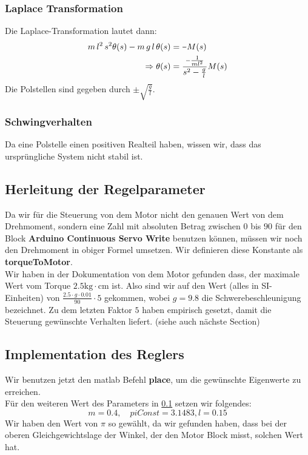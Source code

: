 \documentclass{article}
\newcommand{\minus}{\scalebox{0.75}[1.0]{$-$}}
\newcommand{\geru}{\"{u}}
\begin{document}
\subsubsection{Laplace Transformation}
Die Laplace-Transformation lautet dann:
\begin{align}\label{eq:laplace}
  m \,l^2 \, s^2 \theta(s) - m\,g\,l\, \theta(s) &= \minus M(s)\\
  \Rightarrow \theta(s) &= \frac{\minus \frac{1}{ml^2}}{s^2 - \frac{g}{l}} M(s)
\end{align}
Die Polstellen sind gegeben durch $\pm \sqrt{\frac{g}{l}}$. 
\subsubsection{Schwingverhalten}
Da eine Polstelle einen positiven Realteil haben, wissen wir, dass das urspr\geru ngliche System nicht stabil ist.\\
\subsection{Herleitung der Regelparameter}\label{section:mathsDerive}
Da wir für die Steuerung von dem Motor nicht den genauen Wert von dem Drehmoment, sondern
eine Zahl mit absoluten Betrag zwischen $0$ bis $90$ für den Block \textbf{Arduino Continuous Servo Write} benutzen 
können, müssen wir noch den Drehmoment in obiger Formel umsetzen. Wir definieren diese Konstante als \textbf{torqueToMotor}.\\
Wir haben in der Dokumentation von dem Motor gefunden dass, der maximale Wert vom Torque $2.5 \text{kg} \cdot \text{cm}$ ist. Also sind wir auf
den Wert (alles in SI-Einheiten) von $\frac{2.5 \cdot g \cdot 0.01}{90} \cdot 5 $ gekommen, wobei $g = 9.8$ die Schwerebeschleunigung bezeichnet.
Zu dem letzten Faktor $5$ haben empirisch gesetzt, damit die Steuerung gewünschte Verhalten liefert. (siehe auch nächste Section)
\subsection{Implementation des Reglers}\label{section:reglerImplement}
Wir benutzen jetzt den matlab Befehl \textbf{place}, um die gewünschte Eigenwerte zu erreichen.\\
Für den weiteren Wert des Parameters in \ref{section:mathsDerive} setzen wir folgendes:
\[
  m = 0.4, \quad piConst = 3.1483, l = 0.15
\]
Wir haben den Wert von $\pi$ so gewählt, da wir gefunden haben, dass bei 
der oberen Gleichgewichtslage der Winkel, der den Motor Block misst, solchen
Wert hat. \\ 
\end{document}
